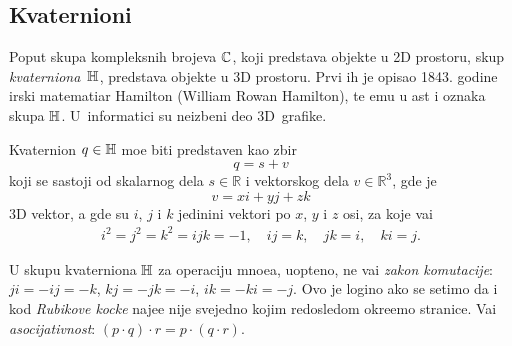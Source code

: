 \subsection{Kvaternioni}

\def\uv{{u}}
\def\vp{{\vec v}}
\def\norm#1{{\vert#1\vert}}
\def\con#1{{\bar#1}}

Poput skupa kompleksnih brojeva ${\mathbb C}$, koji predstav{\lj}a objekte u 2D prostoru,
skup {\sl kvater\-niona\/}~${\mathbb H}$, predstav{\lj}a objekte u 3D prostoru. Prvi ih je opisao 
1843. godine irski ma\-te\-ma\-ti\-{\cv}ar
Hamilton (William Rowan Hamilton), te {\nj}emu u {\cv}ast i oznaka skupa ${\mathbb H}$.
U~informatici su neizbe{\zv}ni deo 3D~grafike.

\medskip

Kvaternion $q\in{\mathbb H}$ mo{\zv}e biti predstav{\lj}en kao zbir
\begin{equation}
    q=s+v
\end{equation}
koji se sastoji od skalarnog dela $s\in{\mathbb R}$ i vektorskog dela $v\in{\mathbb R}^3$, gde je
\begin{equation}
    v=xi+yj+zk
\end{equation}
3D vektor, 
a gde su $i$, $j$ i $k$ jedini{\cv}ni vektori po $x$, $y$ i $z$ osi,
za koje va{\zv}i
\begin{gather}\label{eq:qunits}
    i^2=j^2=k^2=ijk=-1,\quad
    ij=k,\quad jk=i,\quad ki=j. 
\end{gather}

\danger U skupu kvaterniona ${\mathbb H}$ za operaciju mno{\zv}e{\nj}a, uop{\sv}teno, ne va{\zv}i {\sl zakon komutacije}:
$ji=-ij=-k$, $kj=-jk=-i$, $ik=-ki=-j$.
Ovo je logi{\cv}no ako se setimo da i kod
{\sl Rubikove kocke\/} naj{\cv}e{\sv}{\cc}e nije svejedno kojim redosledom okre{\cc}emo stranice.
Va{\zv}i {\sl asocijativnost}: $(p\cdot q)\cdot r=p\cdot(q\cdot r)$.

\medskip

